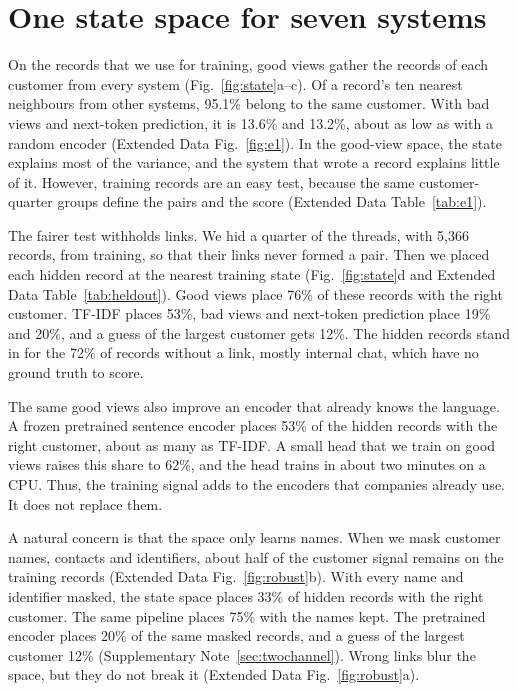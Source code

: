 \documentclass[11pt]{article}
\begin{document}
\section{One state space for seven systems}

On the records that we use for training, good views gather the records of each customer from every system (Fig.~\ref{fig:state}a--c). Of a record's ten nearest neighbours from other systems, 95.1\% belong to the same customer. With bad views and next-token prediction, it is 13.6\% and 13.2\%, about as low as with a random encoder (Extended Data Fig.~\ref{fig:e1}). In the good-view space, the state explains most of the variance, and the system that wrote a record explains little of it. However, training records are an easy test, because the same customer-quarter groups define the pairs and the score (Extended Data Table~\ref{tab:e1}).

The fairer test withholds links. We hid a quarter of the threads, with 5{,}366 records, from training, so that their links never formed a pair. Then we placed each hidden record at the nearest training state (Fig.~\ref{fig:state}d and Extended Data Table~\ref{tab:heldout}). Good views place 76\% of these records with the right customer. TF-IDF places 53\%, bad views and next-token prediction place 19\% and 20\%, and a guess of the largest customer gets 12\%. The hidden records stand in for the 72\% of records without a link, mostly internal chat, which have no ground truth to score.

The same good views also improve an encoder that already knows the language. A frozen pretrained sentence encoder places 53\% of the hidden records with the right customer, about as many as TF-IDF. A small head that we train on good views raises this share to 62\%, and the head trains in about two minutes on a CPU. Thus, the training signal adds to the encoders that companies already use. It does not replace them.

A natural concern is that the space only learns names. When we mask customer names, contacts and identifiers, about half of the customer signal remains on the training records (Extended Data Fig.~\ref{fig:robust}b). With every name and identifier masked, the state space places 33\% of hidden records with the right customer. The same pipeline places 75\% with the names kept. The pretrained encoder places 20\% of the same masked records, and a guess of the largest customer 12\% (Supplementary Note~\ref{sec:twochannel}). Wrong links blur the space, but they do not break it (Extended Data Fig.~\ref{fig:robust}a).
\end{document}
